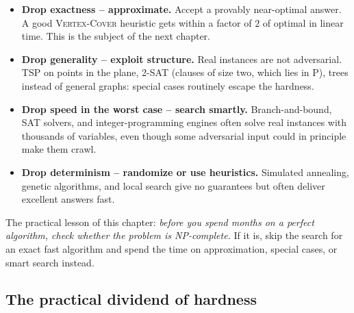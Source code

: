 \begin{itemize}
  \item \textbf{Drop exactness -- approximate.} Accept a provably near-optimal
        answer. A good \textsc{Vertex-Cover} heuristic gets within a factor of $2$
        of optimal in linear time. This is the subject of the next chapter.
  \item \textbf{Drop generality -- exploit structure.} Real instances are not
        adversarial. \textsc{TSP} on points in the plane, \textsc{2-SAT} (clauses
        of size two, which lies in $\mathrm{P}$), trees instead of general
        graphs: special cases routinely escape the hardness.
  \item \textbf{Drop speed in the worst case -- search smartly.} Branch-and-bound,
        SAT solvers, and integer-programming engines often solve real instances
        with thousands of variables, even though some adversarial input could in
        principle make them crawl.
  \item \textbf{Drop determinism -- randomize or use heuristics.} Simulated
        annealing, genetic algorithms, and local search give no guarantees but
        often deliver excellent answers fast.
\end{itemize}

\begin{focusbox}
The practical lesson of this chapter: \emph{before you spend months on a perfect
algorithm, check whether the problem is NP-complete.} If it is, skip the search
for an exact fast algorithm and spend the time on approximation, special cases,
or smart search instead.
\end{focusbox}

\subsection{The practical dividend of hardness}

